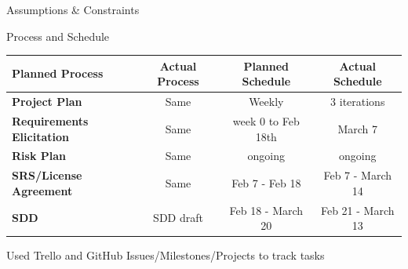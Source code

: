 \documentclass[smaller, aspectratio=169]{beamer}
\begin{document}
  \begin{frame}[standout]
    \Huge{Assumptions \& Constraints}
  \end{frame}

  \begin{frame}{Process and Schedule}
    \begin{center}
    \begin{tabular}{l c c c}
    Planned Process & Actual Process & Planned Schedule & Actual Schedule \\
    \hline
      {\bf Project Plan} & Same & Weekly & 3 iterations \\

      {\bf Requirements Elicitation} & Same & week 0 to Feb 18th & March 7 \\

      {\bf Risk Plan} & Same & ongoing & ongoing \\

      {\bf SRS/License Agreement} & Same  & Feb 7 - Feb 18  & Feb 7 - March 14 \\

      {\bf SDD} & SDD draft & Feb 18 - March 20 & Feb 21 - March 13 \\

    \end{tabular}
    \end{center}
    Used Trello and GitHub Issues/Milestones/Projects to track tasks
  \end{frame}
\end{document}
